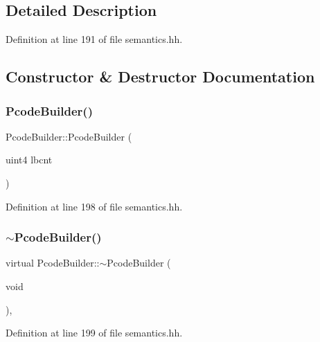 \subsection{Detailed Description}


Definition at line 191 of file semantics.\+hh.



\subsection{Constructor \& Destructor Documentation}
\mbox{\label{class_pcode_builder_af1c62eec00ca64be050b63f6da68a815}} 
\subsubsection{\texorpdfstring{PcodeBuilder()}{PcodeBuilder()}}
{\footnotesize\ttfamily Pcode\+Builder\+::\+Pcode\+Builder (\begin{DoxyParamCaption}\item[{uint4}]{lbcnt }\end{DoxyParamCaption})\hspace{0.3cm}{\ttfamily [inline]}}



Definition at line 198 of file semantics.\+hh.

\mbox{\label{class_pcode_builder_ae547ef047c8ef1fd280d10c4f39e1097}} 
\subsubsection{\texorpdfstring{$\sim$PcodeBuilder()}{~PcodeBuilder()}}
{\footnotesize\ttfamily virtual Pcode\+Builder\+::$\sim$\+Pcode\+Builder (\begin{DoxyParamCaption}\item[{void}]{ }\end{DoxyParamCaption})\hspace{0.3cm}{\ttfamily [inline]}, {\ttfamily [virtual]}}



Definition at line 199 of file semantics.\+hh.



